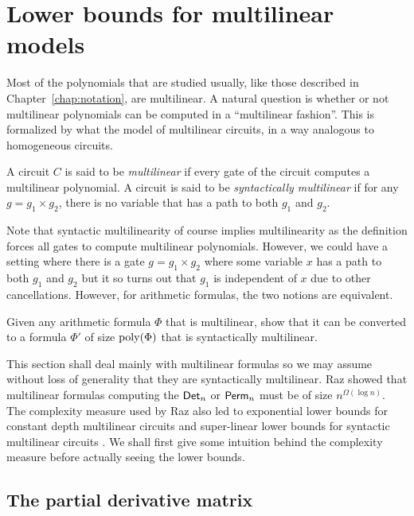 \chapter{Lower bounds for multilinear models}\label{chap:multilinear}

Most of the polynomials that are studied usually, like those described in Chapter~\ref{chap:notation}, are multilinear. A natural question is whether or not multilinear polynomials can be computed in a ``multilinear fashion''. This is formalized by what the model of multilinear circuits, in a way analogous to homogeneous circuits. 

\begin{definition}
A circuit $C$ is said to be \emph{multilinear} if every gate of the circuit computes a multilinear polynomial. A circuit is said to be \emph{syntactically multilinear} if for any $g = g_1 \times g_2$, there is no variable that has a path to both $g_1$ and $g_2$. 
\end{definition}

Note that syntactic multilinearity of course implies multilinearity as the definition forces all gates to compute multilinear polynomials. However, we could have a setting where there is a gate $g = g_1 \times g_2$ where some variable $x$ has a path to both $g_1$ and $g_2$ but it so turns out that $g_1$ is independent of $x$ due to other cancellations. However, for arithmetic formulas, the two notions are equivalent. 

\begin{exercise}
Given any arithmetic formula $\Phi$ that is multilinear, show that it can be converted to a formula $\Phi'$ of size $\mathrm{poly}(\Phi)$ that is syntactically multilinear. 
\end{exercise}

This section shall deal mainly with multilinear formulas so we may assume without loss of generality that they are syntactically multilinear. Raz \cite{raz2004} showed that multilinear formulas computing the $\mathsf{Det}_n$ or $\mathsf{Perm}_n$ must be of size $n^{\Omega(\log n)}$. The complexity measure used by Raz also led to exponential lower bounds for constant depth multilinear circuits \cite{raz-yehudayoff} and super-linear lower bounds for syntactic multilinear circuits \cite{RSY08}. We shall first give some intuition behind the complexity measure before actually seeing the lower bounds. 

\section{The partial derivative matrix}
